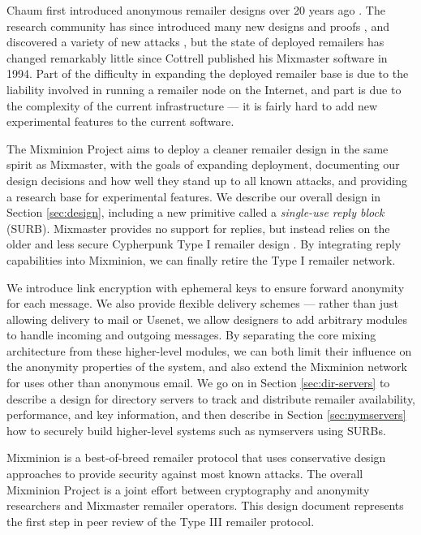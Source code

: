 \documentclass{llncs}
\begin{document}
Chaum first introduced anonymous remailer designs over 20 years ago
\cite{chaum-mix}. The research community has since introduced many new
designs and proofs
\cite{abe,web-mix,babel,flash-mix,realtime-mix,kesdogan,shuffle,hybrid-mix},
and discovered a variety of new attacks
\cite{back-traffic-analysis,langos02,disad-free-routes,desmedt,mitkuro,raymond00},
but the state of deployed remailers has changed remarkably little since
Cottrell published his Mixmaster software \cite{mixmaster-attacks,mixmaster-spec}
in 1994.  Part of the difficulty in expanding the deployed remailer base is
due to the liability involved in running a remailer node on the Internet,
and part is due to the complexity of the current infrastructure ---
it is fairly hard to add new experimental features to the current software.

The Mixminion Project aims to deploy a cleaner remailer design
in the same spirit as Mixmaster, with the goals of expanding
deployment, documenting our design decisions and how well they stand
up to all known attacks, and providing a research base for
experimental features. We describe our overall design in Section
\ref{sec:design}, including a new primitive called a \emph{single-use
reply block} (SURB).  Mixmaster provides no support for replies, but
instead relies on the older and less secure Cypherpunk Type I remailer
design \cite{remailer-history}. By integrating reply capabilities into
Mixminion, we can finally retire the Type I remailer network.

We introduce link encryption with ephemeral keys to ensure forward
anonym\-ity for each message. We also provide flexible delivery schemes ---
rather than just allowing delivery to mail or Usenet, we allow designers
to add arbitrary modules to handle incoming and outgoing messages. By
separating the core mixing architecture from these higher-level modules,
we can both limit their influence on the anonymity properties of the
system, and also extend the Mixminion network for uses other than
anonymous email. We
go on in Section \ref{sec:dir-servers} to describe a design for directory
servers to track and distribute remailer availability, performance,
and key information, and then describe in Section \ref{sec:nymservers}
how to securely build higher-level systems such as nymservers using SURBs.

Mixminion is a best-of-breed remailer protocol that uses conservative design
approaches to provide security against most known attacks. The overall
Mixminion Project is a joint effort between cryptography and anonymity
researchers and Mixmaster remailer operators. This design document
represents the first step in peer review of the Type III remailer
protocol.
\end{document}
